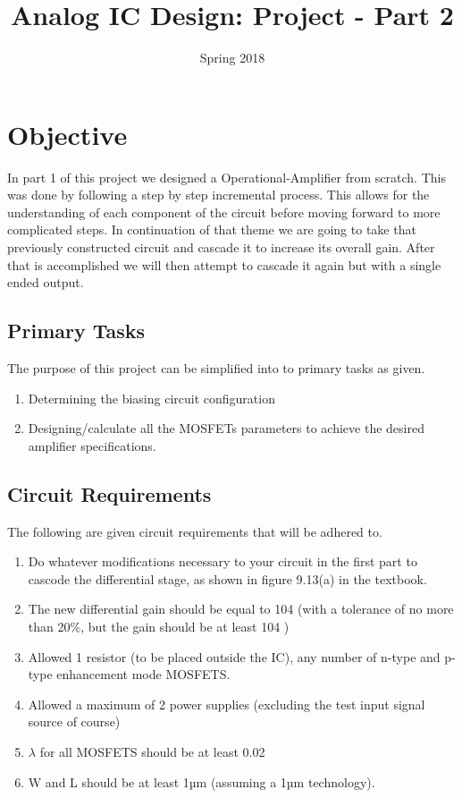 \documentclass[12pt]{article}
\begin{document}
\title{Analog IC Design: Project - Part 2}
\date{Spring 2018}
\maketitle
\tableofcontents

\newpage
\section{Objective}

In part 1 of this project we designed a Operational-Amplifier from scratch. This was done by following a step by step incremental process. This allows for the understanding of each component of the circuit before moving forward to more complicated steps. In continuation of that theme we are going to take that previously constructed circuit and cascade it to increase its overall gain. After that is accomplished we will then attempt to cascade it again but with a single ended output.

\subsection{Primary Tasks}
The purpose of this project can be simplified into to primary tasks as given.
\begin{enumerate}
	\item Determining the biasing circuit configuration
	\item Designing/calculate all the MOSFETs parameters to achieve the desired amplifier
	specifications.
\end{enumerate}

\subsection{Circuit Requirements}
The following are given circuit requirements that will be adhered to.

\begin{enumerate}
	\item Do whatever modifications necessary to your circuit in the first part to cascode the
	differential stage, as shown in figure 9.13(a) in the textbook.
	\item The new differential gain should be equal to 104
	(with a tolerance of no more than
	20\%, but the gain should be at least 104
	)
	\item Allowed 1 resistor (to be placed outside the IC), any number of n-type and
	p-type enhancement mode MOSFETS.
	\item Allowed a maximum of 2 power supplies (excluding the test input signal source
	of course)
	\item $\lambda$ for all MOSFETS should be at least 0.02
	\item W and L should be at least 1µm (assuming a 1µm technology).
\end{enumerate}
\end{document}
